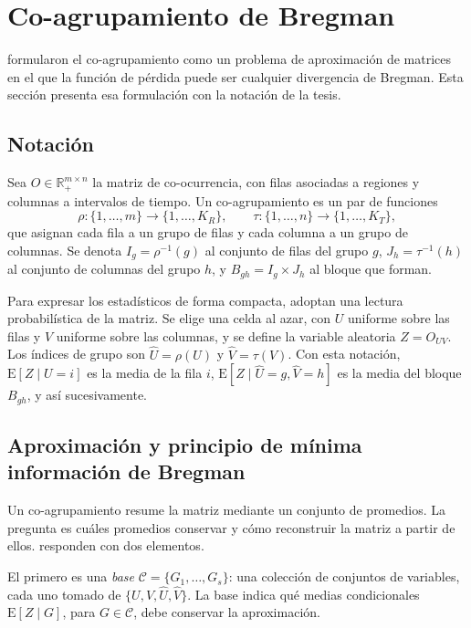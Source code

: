 \section{Co-agrupamiento de Bregman}\label{sec:bbac}

\cite{Banerjee2007} formularon el co-agrupamiento como un problema de aproximación
de matrices en el que la función de pérdida puede ser cualquier divergencia de
Bregman. Esta sección presenta esa formulación con la notación de la tesis.

\subsection{Notación}

Sea $O \in \mathbb{R}_{+}^{m \times n}$ la matriz de co-ocurrencia, con filas
asociadas a regiones y columnas a intervalos de tiempo. Un co-agrupamiento es un
par de funciones
\[
  \rho : \{1, \dots, m\} \to \{1, \dots, K_R\}, \qquad
  \tau : \{1, \dots, n\} \to \{1, \dots, K_T\},
\]
que asignan cada fila a un grupo de filas y cada columna a un grupo de columnas.
Se denota $I_g = \rho^{-1}(g)$ al conjunto de filas del grupo $g$,
$J_h = \tau^{-1}(h)$ al conjunto de columnas del grupo $h$, y
$B_{gh} = I_g \times J_h$ al bloque que forman.

Para expresar los estadísticos de forma compacta, \cite{Banerjee2007} adoptan una
lectura probabilística de la matriz. Se elige una celda al azar, con $U$ uniforme
sobre las filas y $V$ uniforme sobre las columnas, y se define la variable
aleatoria $Z = O_{UV}$. Los índices de grupo son $\hat{U} = \rho(U)$ y
$\hat{V} = \tau(V)$. Con esta notación, $\mathrm{E}[Z \mid U = i]$ es la media de
la fila $i$, $\mathrm{E}[Z \mid \hat{U} = g, \hat{V} = h]$ es la media del bloque
$B_{gh}$, y así sucesivamente.

\subsection{Aproximación y principio de mínima información de Bregman}

Un co-agrupamiento resume la matriz mediante un conjunto de promedios. La pregunta
es cuáles promedios conservar y cómo reconstruir la matriz a partir de ellos.
\cite{Banerjee2007} responden con dos elementos.

El primero es una \emph{base} $\mathcal{C} = \{G_1, \dots, G_s\}$: una colección de
conjuntos de variables, cada uno tomado de $\{U, V, \hat{U}, \hat{V}\}$. La base
indica qué medias condicionales $\mathrm{E}[Z \mid G]$, para $G \in \mathcal{C}$,
debe conservar la aproximación.

